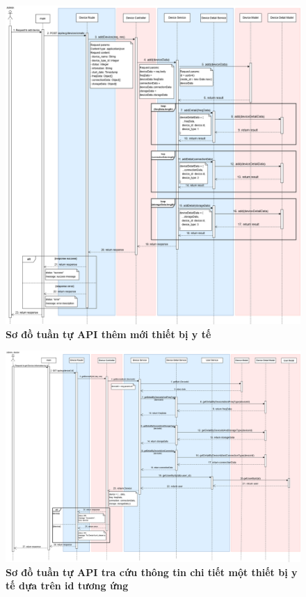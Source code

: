 \begin{figure}[H]
	\centering
	\includegraphics[width=16cm]{Images/api_sequence/device/device-Add.drawio.png}
	\caption[Sơ đồ tuần tự API thêm mới thiết bị y tế]{\bfseries \fontsize{12pt}{0pt}\selectfont Sơ đồ tuần tự API thêm mới thiết bị y tế}
	\label{sequence_diagram_add_device}
\end{figure}

\begin{figure}[H]
	\centering
	\includegraphics[width=16cm]{Images/api_sequence/device/device-GetDeviceById.drawio.png}
	\caption[Sơ đồ tuần tự API tra cứu thông tin chi tiết một thiết bị y tế dựa trên id tương ứng]{\bfseries \fontsize{12pt}{0pt}\selectfont Sơ đồ tuần tự API tra cứu thông tin chi tiết một thiết bị y tế dựa trên id tương ứng}
	\label{sequence_diagram_add_device}
\end{figure}

